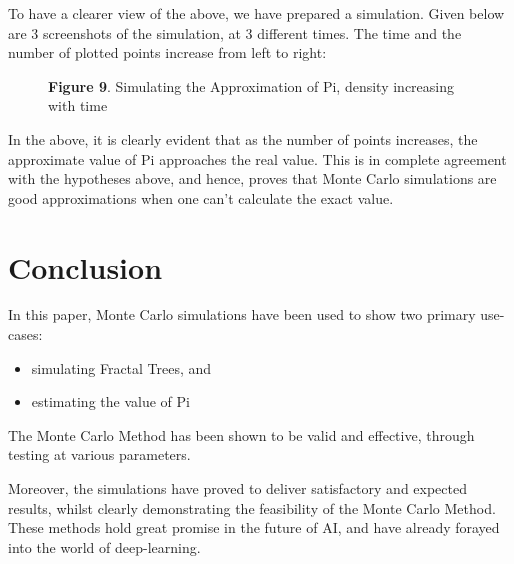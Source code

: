 \documentclass{resonance}
\begin{document}
	To have a clearer view of the above, we have prepared a simulation. Given below are 3 screenshots of the simulation, at 3 different times. The time and the number of plotted points increase from left to right:
	
	\begin{figure}[h!]
		\hskip 0.7cm
		\vspace{20pt}
		\fbox{\texttt{[image: pi\_ss\_1]}}
		\fbox{\texttt{[image: pi\_ss\_2]}}
		\fbox{\texttt{[image: pi\_ss\_3]}}
		
		\vspace{-10pt}
		\hspace{30pt}\scriptsize{\textbf{Figure 9}. \normalfont Simulating the Approximation of Pi, density increasing with time}\\
	\end{figure}
	In the above, it is clearly evident that as the number of points increases, the approximate value of Pi approaches the real value. This is in complete agreement with the hypotheses above, and hence, proves that Monte Carlo simulations are good approximations when one can’t calculate the exact value.
	
	\pagebreak
	\section{Conclusion}
	In this paper, Monte Carlo simulations have been used to show two primary use-cases:
	\begin{itemize}
		\item simulating Fractal Trees, and
		\item estimating the value of Pi
	\end{itemize}
	
	The Monte Carlo Method has been shown to be valid and effective, through testing at various parameters.
	
	Moreover, the simulations have proved to deliver satisfactory and expected results, whilst clearly demonstrating the feasibility of the Monte Carlo Method. These methods hold great promise in the future of AI, and have already forayed into the world of deep-learning.\\\\\\\\\\\\\\\\
	
\end{document}
